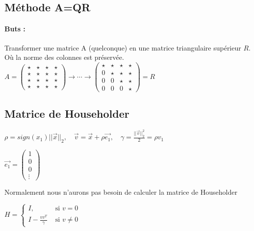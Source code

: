 \documentclass[a4paper,9pt]{extarticle}
\begin{document}
\begin{multicols*}{2}
\section{Méthode A=QR}
\paragraph*{Buts : } Transformer une matrice A (quelconque) en une matrice triangulaire supérieur $R$. Où la norme des colonnes est préservée.
$
A = \begin{pmatrix}
\star & \star & \star & \star \\
\star & \star & \star & \star \\
\star & \star & \star & \star \\
\star & \star & \star & \star
\end{pmatrix}
\rightarrow \cdots \rightarrow
\begin{pmatrix}
\star & \star & \star & \star \\
0 & \star & \star & \star \\
0 & 0 & \star & \star \\
0 & 0 & 0 & \star
\end{pmatrix}
= R
$
\subsection{Matrice de Householder}
$
\rho = sign(x_1)||\vec{x}||_2, \quad \vec{v} = \vec{x} + \rho \vec{e_1},\quad \gamma = \frac{||\vec{v}||^2_2}{2} = \rho v_1
$

$
\vec{e_1} = 
\begin{pmatrix}
1\\
0\\
0\\
\vdots
\end{pmatrix}
$

Normalement nous n'aurons pas besoin de calculer la matrice de Householder

$
H = \begin{cases}
I, &\text{ si } v = 0 \\
I - \frac{vv^T}{\gamma} &\text{ si }v \neq 0
\end{cases}
$


\end{multicols*}
\end{document}
